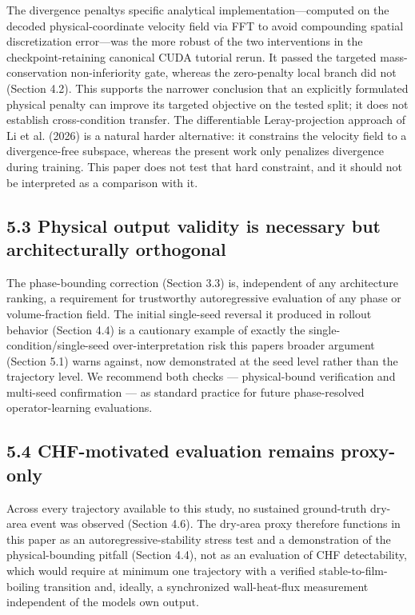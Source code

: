 \documentclass[preprint,12pt]{elsarticle}
\begin{document}
The divergence penalty\textquotesingle s specific analytical
implementation---computed on the decoded physical-coordinate velocity
field via FFT to avoid compounding spatial discretization error---was
the more robust of the two interventions in the checkpoint-retaining
canonical CUDA tutorial rerun. It passed the targeted mass-conservation
non-inferiority gate, whereas the zero-penalty local branch did not
(Section 4.2). This supports the narrower conclusion that an explicitly
formulated physical penalty can improve its targeted objective on the
tested split; it does not establish cross-condition transfer. The
differentiable Leray-projection approach of Li et al. (2026)\cite{li2026project} is a
natural harder alternative: it constrains the velocity field to a
divergence-free subspace, whereas the present work only penalizes
divergence during training. This paper does not test that hard
constraint, and it should not be interpreted as a comparison with it.

\subsection*{5.3 Physical output validity is necessary but
architecturally
orthogonal}\label{53-physical-output-validity-is-necessary-but-architecturally-orthogonal}

The phase-bounding correction (Section 3.3) is, independent of any
architecture ranking, a requirement for trustworthy autoregressive
evaluation of any phase or volume-fraction field. The initial
single-seed reversal it produced in rollout behavior (Section 4.4) is a
cautionary example of exactly the single-condition/single-seed
over-interpretation risk this paper\textquotesingle s broader argument
(Section 5.1) warns against, now demonstrated at the seed level rather
than the trajectory level. We recommend both checks --- physical-bound
verification and multi-seed confirmation --- as standard practice for
future phase-resolved operator-learning evaluations.

\subsection*{5.4 CHF-motivated evaluation remains
proxy-only}\label{54-chf-motivated-evaluation-remains-proxy-only}

Across every trajectory available to this study, no sustained
ground-truth dry-area event was observed (Section 4.6). The dry-area
proxy therefore functions in this paper as an autoregressive-stability
stress test and a demonstration of the physical-bounding pitfall
(Section 4.4), not as an evaluation of CHF detectability, which would
require at minimum one trajectory with a verified stable-to-film-boiling
transition and, ideally, a synchronized wall-heat-flux measurement
independent of the model\textquotesingle s own output.
\end{document}
